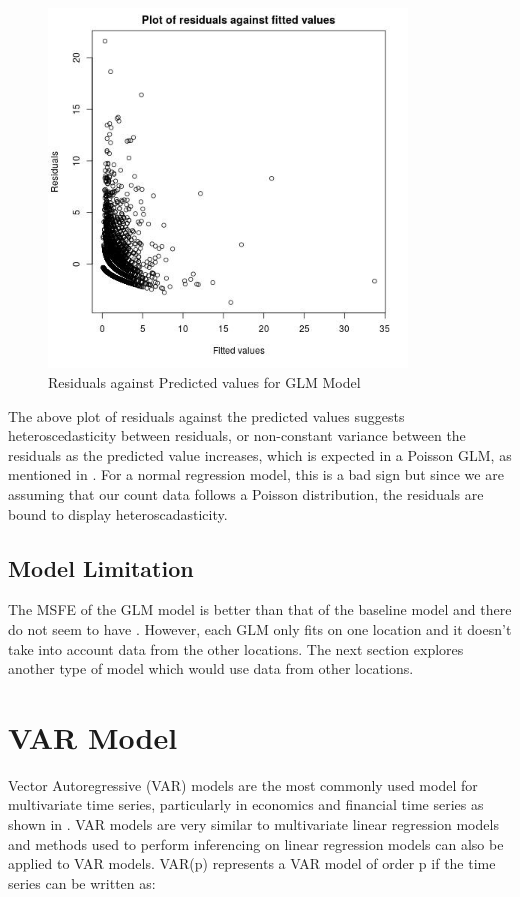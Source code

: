 \documentclass[12pt, letterpaper] {article}
\begin{document}
\begin{figure}[H]
    \centering
    \includegraphics[width=0.85\textwidth, height=0.6\textheight]{Images/Full_GLM_resids_vs_fitted.jpg}
    \caption{Residuals against Predicted values for GLM Model}
    \label{fig:Residuals against Predicted values for GLM Model}
\end{figure}

\noindent The above plot of residuals against the predicted values suggests heteroscedasticity between residuals, or non-constant variance between the residuals as the predicted value increases, which is expected in a Poisson GLM, as mentioned in \cite{Dylan2017}. For a normal regression model, this is a bad sign but since we are assuming that our count data follows a Poisson distribution, the residuals are bound to display heteroscadasticity. 

\subsection{Model Limitation}

The MSFE of the GLM model is better than that of the baseline model and there do not seem to have . However, each GLM only fits on one location and it doesn't take into account data from the other locations. The next section explores another type of model which would use data from other locations. 

\section{VAR Model}
Vector Autoregressive (VAR) models are the most commonly used model for multivariate time series, particularly in economics and financial time series as shown in \cite{Hilde2000}. VAR models are very similar to multivariate linear regression models and methods used to perform inferencing on linear regression models can also be applied to VAR models. VAR(p) represents a VAR model of order p if the time series can be written as: 
\end{document}
